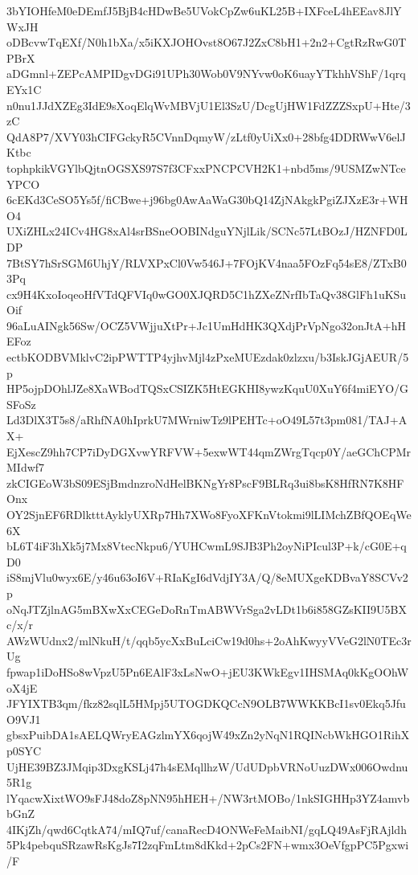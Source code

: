 3bYIOHfeM0eDEmfJ5BjB4cHDwBe5UVokCpZw6uKL25B+IXFceL4hEEav8JlYWxJH
oDBcvwTqEXf/N0h1bXa/x5iKXJOHOvst8O67J2ZxC8bH1+2n2+CgtRzRwG0TPBrX
aDGmnl+ZEPcAMPIDgvDGi91UPh30Wob0V9NYvw0oK6uayYTkhhVShF/1qrqEYx1C
n0nu1JJdXZEg3IdE9sXoqElqWvMBVjU1El3SzU/DcgUjHW1FdZZZSxpU+Hte/3zC
QdA8P7/XVY03hCIFGckyR5CVnnDqmyW/zLtf0yUiXx0+28bfg4DDRWwV6elJKtbc
tophpkikVGYlbQjtnOGSXS97S7f3CFxxPNCPCVH2K1+nbd5ms/9USMZwNTceYPCO
6cEKd3CeSO5Ys5f/fiCBwe+j96bg0AwAaWaG30bQ14ZjNAkgkPgiZJXzE3r+WHO4
UXiZHLx24ICv4HG8xAl4srBSneOOBINdguYNjlLik/SCNc57LtBOzJ/HZNFD0LDP
7BtSY7hSrSGM6UhjY/RLVXPxCl0Vw546J+7FOjKV4naa5FOzFq54sE8/ZTxB03Pq
cx9H4KxoIoqeoHfVTdQFVIq0wGO0XJQRD5C1hZXeZNrfIbTaQv38GlFh1uKSuOif
96aLuAINgk56Sw/OCZ5VWjjuXtPr+Jc1UmHdHK3QXdjPrVpNgo32onJtA+hHEFoz
ectbKODBVMklvC2ipPWTTP4yjhvMjl4zPxeMUEzdak0zlzxu/b3IskJGjAEUR/5p
HP5ojpDOhlJZe8XaWBodTQSxCSIZK5HtEGKHI8ywzKquU0XuY6f4miEYO/GSFoSz
Ld3DlX3T5s8/aRhfNA0hIprkU7MWrniwTz9lPEHTc+oO49L57t3pm081/TAJ+AX+
EjXescZ9hh7CP7iDyDGXvwYRFVW+5exwWT44qmZWrgTqcp0Y/aeGChCPMrMIdwf7
zkCIGEoW3bS09ESjBmdnzroNdHelBKNgYr8PscF9BLRq3ui8bsK8HfRN7K8HFOnx
OY2SjnEF6RDlktttAyklyUXRp7Hh7XWo8FyoXFKnVtokmi9lLIMchZBfQOEqWe6X
bL6T4iF3hXk5j7Mx8VtecNkpu6/YUHCwmL9SJB3Ph2oyNiPIcul3P+k/cG0E+qD0
iS8mjVlu0wyx6E/y46u63oI6V+RIaKgI6dVdjIY3A/Q/8eMUXgeKDBvaY8SCVv2p
oNqJTZjlnAG5mBXwXxCEGeDoRnTmABWVrSga2vLDt1b6i858GZsKII9U5BXc/x/r
AWzWUdnx2/mlNkuH/t/qqb5ycXxBuLciCw19d0hs+2oAhKwyyVVeG2lN0TEc3rUg
fpwap1iDoHSo8wVpzU5Pn6EAlF3xLsNwO+jEU3KWkEgv1IHSMAq0kKgOOhWoX4jE
JFYIXTB3qm/fkz82sqlL5HMpj5UTOGDKQCcN9OLB7WWKKBcI1sv0Ekq5JfuO9VJ1
gbsxPuibDA1sAELQWryEAGzlmYX6qojW49xZn2yNqN1RQINcbWkHGO1RihXp0SYC
UjHE39BZ3JMqip3DxgKSLj47h4sEMqllhzW/UdUDpbVRNoUuzDWx006Owdnu5R1g
lYqacwXixtWO9sFJ48doZ8pNN95hHEH+/NW3rtMOBo/1nkSIGHHp3YZ4amvbbGnZ
4IKjZh/qwd6CqtkA74/mIQ7uf/canaRecD4ONWeFeMaibNI/gqLQ49AsFjRAjldh
5Pk4pebquSRzawRsKgJs7I2zqFmLtm8dKkd+2pCs2FN+wmx3OeVfgpPC5Pgxwi/F
